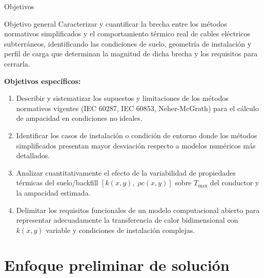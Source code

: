 \documentclass[aspectratio=169]{beamer}
\begin{document}
\begin{frame}{Objetivos}

\begin{block}{Objetivo general}
\justifying\small
Caracterizar y cuantificar la brecha entre los métodos normativos
simplificados y el comportamiento térmico real de cables eléctricos
subterráneos, identificando las condiciones de suelo, geometría de
instalación y perfil de carga que determinan la magnitud de dicha
brecha y los requisitos para cerrarla.
\end{block}

\vspace{0.5em}
\textbf{Objetivos específicos:}
\begin{enumerate}[leftmargin=*]\small
    \item Describir y sistematizar los supuestos y limitaciones de los
          métodos normativos vigentes (IEC 60287, IEC 60853, Neher-McGrath)
          para el cálculo de ampacidad en condiciones no ideales.
    \item Identificar los casos de instalación o condición de entorno donde
          los métodos simplificados presentan mayor desviación respecto a
          modelos numéricos más detallados.
    \item Analizar cuantitativamente el efecto de la variabilidad de
          propiedades térmicas del suelo/backfill $[k(x,y),\;\rho c(x,y)]$
          sobre $T_{\max}$ del conductor y la ampacidad estimada.
    \item Delimitar los requisitos funcionales de un modelo computacional
          abierto para representar adecuadamente la transferencia de calor
          bidimensional con $k(x,y)$ variable y condiciones de instalación
          complejas.
\end{enumerate}
\end{frame}



\section{Enfoque preliminar de solución}
\end{document}
